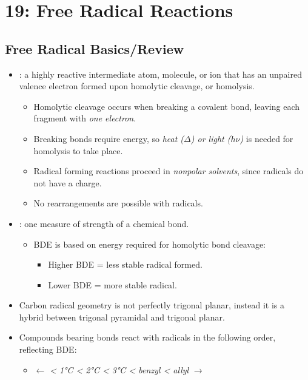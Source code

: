 \chapter{19: Free Radical Reactions}\label{19: Free Radical Reactions}
\section{Free Radical Basics/Review}\label{Free Radical Basics/Review}
\begin{itemize}
    \item {}: a highly reactive intermediate atom, molecule, or ion that has an unpaired valence electron formed upon homolytic cleavage, or homolysis. 
      \begin{itemize}
        \item Homolytic cleavage occurs when breaking a covalent bond, leaving each fragment with \emph{one electron}.
        \item Breaking bonds require energy, so \emph{heat (\(\Delta \)) or light (\(h\nu \))} is needed for homolysis to take place.
        \item Radical forming reactions proceed in \emph{nonpolar solvents}, since radicals do not have a charge.
        \item No rearrangements are possible with radicals.
      \end{itemize}
    \item {}: one measure of strength of a chemical bond. 
      \begin{itemize}
        \item BDE is based on energy required for homolytic bond cleavage:
          \begin{itemize}
            \item Higher BDE = less stable radical formed.
            \item Lower BDE = more stable radical.
          \end{itemize}
      \end{itemize}
    \item Carbon radical geometry is not perfectly trigonal planar, instead it is a hybrid between trigonal pyramidal and trigonal planar.
    \item Compounds bearing  bonds react with radicals in the following order, reflecting  BDE\@:
      \begin{itemize}
        \item {} \(\leftarrow \) \emph{ < \ang{1}C < \ang{2}C < \ang{3}C < benzyl < allyl} \(\rightarrow \) 

\end{itemize}
\end{itemize}
